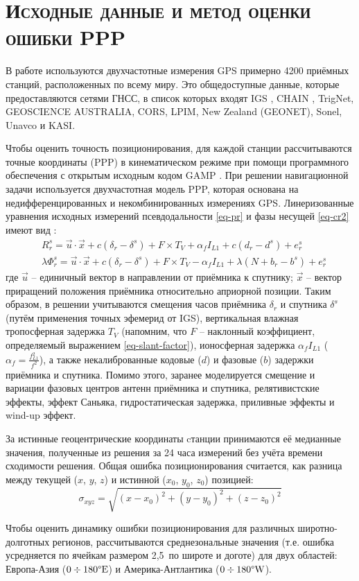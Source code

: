 \section{\textsc{Исходные данные и метод оценки ошибки PPP}}

В работе используются двухчастотные измерения GPS примерно 4200 приёмных станций, расположенных по всему миру.
Это общедоступные данные, которые предоставляются сетями ГНСС, в список которых входят IGS \cite{Dow2009}, CHAIN \cite{Jayachandran2009}, TrigNet, GEOSCIENCE AUSTRALIA, CORS, LPIM, New Zealand (GEONET), Sonel, Unavco и KASI.

Чтобы оценить точность позиционирования, для каждой станции рассчитываются точные координаты (PPP) в кинематическом режиме при помощи программного обеспечения с открытым исходным кодом GAMP \cite{Zhou2018}. 
При решении навигационной задачи используется двухчастотная модель PPP, которая основана на недифференцированных и некомбинированных измерениях GPS.
Линеризованные уравнения исходных измерений псевдодальности \eqref{eq-pr} и фазы несущей \eqref{eq-cr2} имеют вид \cite{Zhou2018}:
\begin{equation}
\begin{aligned}
&R_r^s=\vec{u}\cdot\vec{x}+c(\delta_r-\delta^s)+F\times T_V+\alpha_fI_{L1}+c(d_r-d^s)+e_r^s \\
&\lambda\Phi_r^s=\vec{u}\cdot\vec{x}+c(\delta_r-\delta^s)+F\times T_V-\alpha_fI_{L1}+\lambda(N+b_r-b^s)+e_r^s
\end{aligned}
\end{equation}  
где 
$\vec{u}$ -- единичный вектор в направлении от приёмника к спутнику; 
$\vec{x}$ -- вектор приращений положения приёмника относительно априорной позиции.
Таким образом, в решении учитываются смещения часов приёмника $\delta_r$ и спутника $\delta^s$ (путём применения точных эфемерид от IGS), вертикальная влажная тропосферная задержка $T_V$ (напомним, что $F$ -- наклонный коэффициент, определяемый выражением \eqref{eq-slant-factor}), ионосферная задержка $\alpha_fI_{L1}$ ($\alpha_f=\frac{f_{L1}^2}{f^2}$), а также некалиброванные кодовые ($d$) и фазовые ($b$) задержки приёмника и спутника.   
Помимо этого, заранее моделируется смещение и вариации фазовых центров антенн приёмника и спутника, релятивистские эффекты, эффект Саньяка, гидростатическая задержка, приливные эффекты и wind-up эффект.

За истинные геоцентрические координаты cтанции принимаются её медианные значения, полученные из решения за 24 часа измерений без учёта времени сходимости решения.
Общая ошибка позиционирования считается, как разница между текущей ($x$, $y$, $z$) и истинной ($x_0$, $y_0$, $z_0$) позицией:
\begin{equation}
\sigma_{xyz}=\sqrt{(x-x_0)^2+(y-y_0)^2+(z-z_0)^2}
\label{eq-3d-error}
\end{equation}

Чтобы оценить динамику ошибки позиционирования для различных широтно-долготных регионов, рассчитываются среднезональные значения (т.е. ошибка усредняется по ячейкам размером 2,5\degree~по широте и доготе) для двух областей: Европа-Азия ($0\div180\degree \text{E}$) и Америка-Антлантика ($0\div180\degree \text{W}$).  